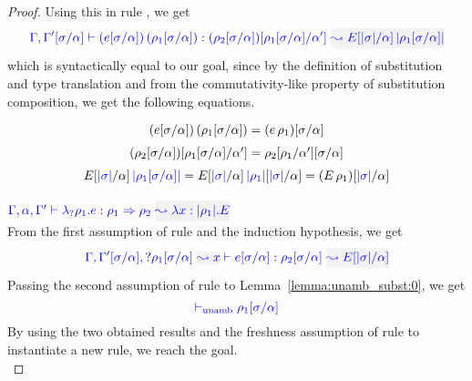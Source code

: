 \begin{proof}
Using this in rule , we get
\begin{equation*}
\wte{\tenv,\tenv'[\suty/\alpha]}{\mmapp{(e[\suty/\alpha])}{(\rulet_1[\suty/\alpha])}}{(\rulet_2[\suty/\alpha])[\rulet_1[\suty/\alpha] /\alpha']}{\mmapp{E[\etrans{\suty}/\alpha]}{\etrans{\rulet_1[\suty/\alpha]}}}
\end{equation*}
which is syntactically equal to our goal, since by the definition of substitution and type
translation and from the commutativity-like property of substitution composition, we get the following equations.
\begin{equation*}
\arraycolsep=1.4pt\def\arraystretch{1.5}
\begin{array}{c}
\mmapp{(e[\suty/\alpha])}{(\rulet_1[\suty/\alpha])} = (\mmapp{e}{\rulet_1})[\suty/\alpha]\\
(\rulet_2[\suty/\alpha])[\rulet_1[\suty/\alpha] /\alpha'] = \rulet_2[\rulet_1/\alpha'][\suty/\alpha]\\
\mmapp{E[\etrans{\suty}/\alpha]}{\etrans{\rulet_1[\suty/\alpha]}} = \mmapp{E[\etrans{\suty}/\alpha]}{\etrans{\rulet_1}[\etrans{\suty}/\alpha]} = (\mmapp{E}{\rulet_1})[\etrans{\suty}/\alpha]
\end{array}
\end{equation*}

\item[\fbox{\rref{Ty-IAbs}}]\quad$\wte{\tenv,\alpha,\tenv'}{\ruleabs{\rulet_1}{e}}{\rulet_1 \iarrow \rulet_2}{\abs{x}{\etrans{\rulet_1}}{E}}$\\

From the first assumption of rule  and the induction hypothesis, we get
\begin{equation*}
\wte{\tenv,\tenv'[\suty/\alpha],\envi{\rulet_1[\suty/\alpha]}{x}}{e[\suty/\alpha]}{\rulet_2[\suty/\alpha]}{E[\etrans{\suty}/\alpha]}
\end{equation*}
Passing the second assumption of rule  to Lemma~\ref{lemma:unamb_subst:0}, we get
\begin{equation*}
{\color{blue}  \vdash_{\mathrm{unamb}}\rho_1[\sigma/\alpha]}
\end{equation*}
By using the two obtained results and the freshness assumption of rule 
to instantiate a new  rule, we reach the goal.\\


\end{proof}
